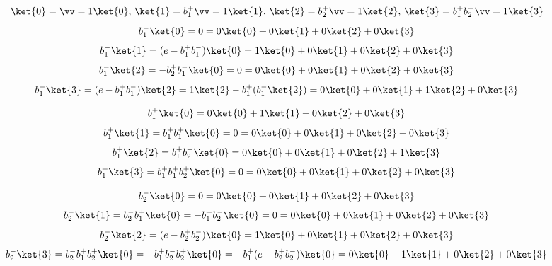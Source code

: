 \documentclass[12pt]{kiarticle}
\begin{document}
\begin{equation}\label{}
\ket{0}  = \vv = 1\ket{0},\, \ket{1} = b^+_1\vv = 1\ket{1},\, \ket{2} = b^+_2\vv = 1\ket{2},\, \ket{3} = b^+_1b^+_2\vv = 1\ket{3}
\end{equation}
%
\begin{equation}\label{}
b^-_1\ket{0} = 0 = 0\ket{0} + 0\ket{1} + 0\ket{2} + 0\ket{3}
\end{equation}
%
\begin{equation}\label{}
b^-_1\ket{1} = (e - b^+_1b^-_1)\ket{0} = 1\ket{0} + 0\ket{1} + 0\ket{2} + 0\ket{3}
\end{equation}
%
\begin{equation}\label{}
b^-_1\ket{2} = - b^+_2b^-_1\ket{0} = 0 = 0\ket{0} + 0\ket{1} + 0\ket{2} + 0\ket{3}
\end{equation}
%
\begin{equation}\label{}
b^-_1\ket{3} = (e - b^+_1b^-_1)\ket{2} = 1\ket{2} - b^+_1(b^-_1\ket{2}) = 0\ket{0} + 0\ket{1} + 1\ket{2} + 0\ket{3}
\end{equation}

\begin{equation}\label{}
b^+_1\ket{0} = 0\ket{0} + 1\ket{1} + 0\ket{2} + 0\ket{3}
\end{equation}
%
\begin{equation}\label{}
b^+_1\ket{1} = b^+_1b^+_1\ket{0} = 0 = 0\ket{0} + 0\ket{1} + 0\ket{2} + 0\ket{3}
\end{equation}
%
\begin{equation}\label{}
b^+_1\ket{2} = b^+_1b^+_2\ket{0} = 0\ket{0} + 0\ket{1} + 0\ket{2} + 1\ket{3}
\end{equation}
%
\begin{equation}\label{}
b^+_1\ket{3} = b^+_1b^+_1b^+_2\ket{0} = 0 = 0\ket{0} + 0\ket{1} + 0\ket{2} + 0\ket{3}
\end{equation}

\begin{equation}\label{}
b^-_2\ket{0} = 0 = 0\ket{0} + 0\ket{1} + 0\ket{2} + 0\ket{3}
\end{equation}
%
\begin{equation}\label{}
b^-_2\ket{1} = b^-_2b^+_1\ket{0} = -b^+_1b^-_2\ket{0} = 0 = 0\ket{0} + 0\ket{1} + 0\ket{2} + 0\ket{3}
\end{equation}
%
\begin{equation}\label{}
b^-_2\ket{2} = (e - b^+_2b^-_2)\ket{0} = 1\ket{0} + 0\ket{1} + 0\ket{2} + 0\ket{3}
\end{equation}
%
\begin{equation}\label{}
b^-_2\ket{3} = b^-_2b^+_1b^+_2\ket{0} = -b^+_1b^-_2b^+_2\ket{0} = -b^+_1(e - b^+_2b^-_2)\ket{0} = 0\ket{0} - 1\ket{1} + 0\ket{2} + 0\ket{3}
\end{equation}
\end{document}
